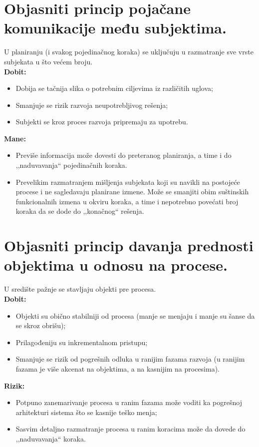 \documentclass[a4paper]{article}
\begin{document}
\section{Objasniti princip pojačane komunikacije među subjektima.}
  U planiranju (i svakog pojedinačnog koraka) se uključuju u razmatranje 
  sve vrste subjekata u što većem broju.\\
  \textbf{Dobit:}
  \begin{itemize}
    \item Dobija se tačnija slika o potrebnim ciljevima iz različitih uglova;
    \item Smanjuje se rizik razvoja neupotrebljivog rešenja;
    \item Subjekti se kroz proces razvoja pripremaju za upotrebu.
  \end{itemize}
  \textbf{Mane:}
  \begin{itemize}
    \item Previše informacija može dovesti do preteranog planiranja, a time i do ,,naduvavanja`` 
          pojedinačnih koraka.
    \item Prevelikim razmatranjem mišljenja subjekata koji su navikli na postojeće procese i ne sagledavaju 
          planirane izmene. Može se smanjiti obim suštinskih funkcionalnih izmena u okviru koraka, a time i 
          nepotrebno povećati broj koraka da se dode do ,,konačnog`` rešenja.
  \end{itemize}

\section{Objasniti princip davanja prednosti objektima u odnosu na procese.}
  U središte pažnje se stavljaju objekti pre procesa. \\
  \textbf{Dobit:}
  \begin{itemize}
    \item Objekti su obično stabilniji od procesa (manje se menjaju i manje su šanse da se skroz obrišu);
    \item Prilagođeniju su inkrementalnom pristupu;
    \item Smanjuje se rizik od pogrešnih odluka u ranijim fazama razvoja (u ranijim fazama je više 
          akcenat na objektima, a na kasnijim na procesima). 
  \end{itemize}
  \textbf{Rizik:}
  \begin{itemize}
    \item Potpuno zanemarivanje procesa u ranim fazama može voditi ka pogrešnoj arhitekturi sistema
          što se kasnije teško menja;
    \item Sasvim detaljno razmatranje procesa u ranim koracima može da dovede do ,,naduvavanja`` koraka.
  \end{itemize}
\end{document}
